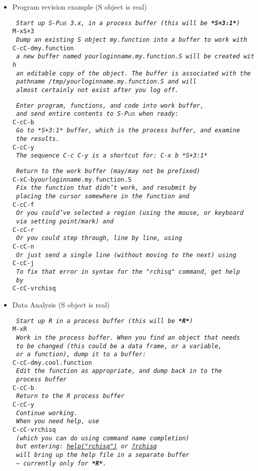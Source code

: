 \documentclass{article}
\newcommand*{\Splus}{\textsc{S-Plus}}
\newcommand*{\Scmt}[1]{\hbox{\qquad {\footnotesize \#\#} \textsl{#1}}}
\newenvironment{Salltt}{\small\begin{alltt}}{\end{alltt}}
\begin{document}
\begin{itemize}
\item Program revision example (S object is real)
  \begin{Salltt}
  \Scmt{Start up \Splus~3.x, in a process buffer (this will be \textbf{*S+3:1*})} 
  M-x S+3
  \Scmt{Dump an existing S object my.function into a buffer to work with}
  C-c C-d my.function
  \Scmt{a new buffer named \textit{yourloginname}.my.function.S will be created with}
  \Scmt{an editable copy of the object.  The buffer is associated with the}
  \Scmt{pathname {\footnotesize /tmp/\textit{yourloginname}.my.function.S} and will}
  \Scmt{almost certainly not exist after you log off.}

  \Scmt{Enter program, functions, and code into work buffer,}
  \Scmt{and send entire contents to \Splus\ when ready:}
  C-c C-b
  \Scmt{Go to *S+3:1* buffer, which is the process buffer, and examine}
  \Scmt{the results.}
  C-c C-y
  \Scmt{The sequence C-c C-y is a shortcut for:  C-x b *S+3:1*}

  \Scmt{Return to the work buffer (may/may not be prefixed)}
  C-x C-b \textit{yourloginname}.my.function.S
  \Scmt{Fix the function that didn't work, and resubmit by}
  \Scmt{placing the cursor somewhere in the function and}
  C-c C-f
  \Scmt{Or you could've selected a region (using the mouse, or keyboard}
  \Scmt{via setting point/mark) and}
  C-c C-r
  \Scmt{Or you could step through, line by line, using}
  C-c C-n
  \Scmt{Or just send a single line (without moving to the next) using}
  C-c C-j
  \Scmt{To fix that error in syntax for the "rchisq" command, get help}
  \Scmt{by}
  C-c C-v rchisq
\end{Salltt}
\item Data Analysis (S object is real)
\begin{Salltt}
  \Scmt{Start up R in a process buffer (this will be \textbf{*R*})} 
  M-x R
  \Scmt{Work in the process buffer.  When you find an object that needs}
  \Scmt{to be changed (this could be a data frame, or a variable,}
  \Scmt{or a function), dump it to a buffer:}
  C-c C-d my.cool.function
  \Scmt{Edit the function as appropriate, and dump back in to the}
  \Scmt{process buffer}
  C-c C-b
  \Scmt{Return to the R process buffer}
  C-c C-y
  \Scmt{Continue working.}
  \Scmt{When you need help, use}
  C-c C-v rchisq
  \Scmt{(which you can do using command name completion)}
  \Scmt{but entering:   \underline{help("rchisq")} or  \underline{?rchisq}}
  \Scmt{will bring up the help file in a separate buffer}
  \Scmt{\emph{--- currently only for \textbf{*R*}}.}
\end{Salltt}
\end{itemize}
\end{document}

